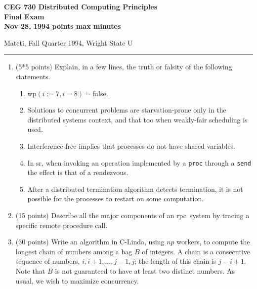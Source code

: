 \def\fat{\framebox[1mm]{\rule{0mm}{2mm}}}
\def\pr{$\parallel$}
\def\rar{$\rightarrow$}
\def\CSP{{\sc csp}}
\def\RPC{{\sc rpc}}
\def\SR{{\sc sr}}

\textheight=9.0in
\parindent=0pt

\thispagestyle{empty}

{\bf CEG 
\large \bf 730 Distributed Computing Principles\\[5pt]
\large Final Exam\\[10pt]
Nov 28, 1994 points max  minutes\\
}

{Mateti,  Fall Quarter 1994, Wright State U}\\[-5pt]
\hrule

\begin{enumerate}

\item (5*5 points)
Explain, in a few lines, the truth or falsity of the following
statements.

\begin{enumerate}
\item
wp$(i := 7, i = 8) = $false.

\item
Solutions to concurrent problems are starvation-prone
only in the distributed systems context, and that too
when weakly-fair scheduling is used.

\item
Interference-free implies that processes do not have shared variables.

\item
In \SR, when invoking an operation implemented by a {\tt proc} through
a {\tt send} the effect is that of a rendezvous.

\item
After a distributed termination algorithm detects termination, it
is not possible for the processes to restart on some
computation.

\end{enumerate}

\item (15 points)
Describe all the major components of an \RPC\ system by
tracing a specific remote procedure call.

\item (30 points)
Write an algorithm in C-Linda, using $np$ workers,
to compute the longest chain of numbers among a bag $B$ of
integers.  A chain is a consecutive sequence of numbers, $i, i+1, ...,
j-1, j$; the length of this chain is $j-i+1$.  Note that $B$ is not
guaranteed to have at least two distinct numbers.  As usual, we wish
to maximize concurrency.


\end{enumerate}
